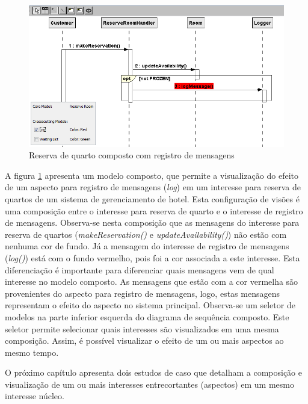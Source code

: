 \begin{landscape}
  \begin{figure}[!h]
	\centering
	\includegraphics[scale=0.8]{img/case_study_compound_1.png}
	\caption{Reserva de quarto composto com registro de mensagens}\label{fig:case_study_compound_1}
  \end{figure}
\end{landscape}

A figura \ref{fig:case_study_compound_1} apresenta um modelo composto, que permite a visualização do efeito de um aspecto para registro de mensagens
(\textit{log}) em um interesse para reserva de quartos de um sistema de gerenciamento de hotel. Esta configuração de visões é uma composição
entre o interesse para reserva de quarto e o interesse de registro de mensagens. Observa-se nesta composição que as mensagens do interesse para reserva de 
quartos (\textit{makeReservation()} e \textit{updateAvailability()}) não estão com nenhuma cor de fundo. Já a mensagem do interesse de registro de
mensagens (\textit{log()}) está com o fundo vermelho, pois foi a cor associada a este interesse. Esta diferenciação é importante para diferenciar quais mensagens 
vem de qual interesse no modelo composto. As mensagens que estão com a cor vermelha são provenientes do aspecto para registro de mensagens, logo,
estas mensagens representam o efeito do aspecto no sistema principal. Observa-se um seletor de modelos na parte inferior esquerda do diagrama de
sequência composto. Este seletor permite selecionar quais interesses são visualizados em uma mesma composição. Assim, é possível visualizar o efeito
de um ou mais aspectos ao mesmo tempo. 

O próximo capítulo apresenta dois estudos de caso que detalham a composição e visualização de um ou mais interesses entrecortantes (aspectos) em um
mesmo interesse núcleo.

